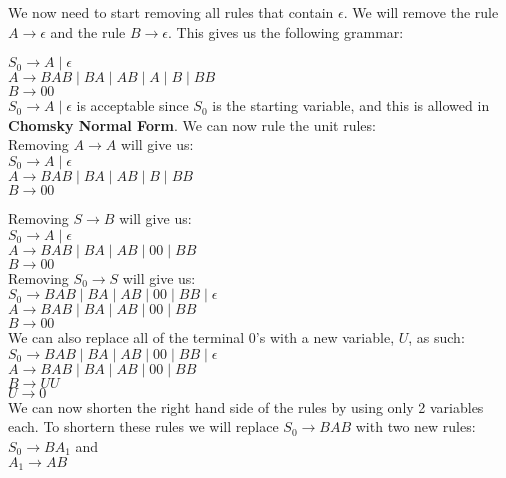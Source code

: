 \documentclass[12pt]{article}
\begin{document}
We now need to start removing all rules that contain $\epsilon$. We will remove the rule
$A \rightarrow \epsilon$ and the rule $B \rightarrow \epsilon$. This gives us the following
grammar:

$S_0 \rightarrow A \; | \; \epsilon$ \\
$A \rightarrow BAB \; | \; BA \; | \; AB \; | \; A \; | \; B \; | \; BB $ \\
$B \rightarrow 00 $ \\

$S_0 \rightarrow A \; | \; \epsilon$ is acceptable since $S_0$ is the starting variable,
and this is allowed in \textbf{Chomsky Normal Form}. We can now rule the unit rules: \\

Removing $A \rightarrow A$ will give us: \\
$S_0 \rightarrow A \; | \; \epsilon$ \\
$A \rightarrow BAB \; | \; BA \; | \; AB \; | \; B \; | \; BB $ \\
$B \rightarrow 00 $ \\

\pagebreak

Removing $S \rightarrow B$ will give us: \\
$S_0 \rightarrow A \; | \; \epsilon$ \\
$A \rightarrow BAB \; | \; BA \; | \; AB \; | \; 00 \; | \; BB $ \\
$B \rightarrow 00 $ \\

Removing $S_0 \rightarrow S$ will give us: \\
$S_0 \rightarrow BAB \; | \; BA \; | \; AB \; | \; 00 \; | \; BB \; | \; \epsilon$ \\
$A \rightarrow BAB \; | \; BA \; | \; AB \; | \; 00 \; | \; BB $ \\
$B \rightarrow 00 $ \\

We can also replace all of the terminal 0's with a new variable, $U$, as such:
$S_0 \rightarrow BAB \; | \; BA \; | \; AB \; | \; 00 \; | \; BB \; | \; \epsilon$ \\
$A \rightarrow BAB \; | \; BA \; | \; AB \; | \; 00 \; | \; BB $ \\
$B \rightarrow UU $ \\
$U \rightarrow 0$ \\

We can now shorten the right hand side of the rules by using only 2 variables each.
To shortern these rules we will replace $S_0 \rightarrow BAB$ with two new rules: \\
$S_0 \rightarrow BA_1$ and \\
$A_1 \rightarrow AB$ \\
\end{document}
